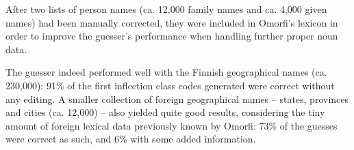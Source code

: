 \documentclass{llncs}
\begin{document}
%
% 

After two lists of person names (ca. 12,000 family names and ca. 4,000 given names) 
had been manually corrected, they were included in Omorfi's lexicon in order to improve the guesser's performance
when handling further proper noun data. 


The guesser indeed performed well with the Finnish geographical
names (ca. 230,000): 91\% of the first inflection class codes generated were
correct without any editing. A smaller collection of foreign
geographical names -- states, provinces and cities (ca. 12,000) --
also yielded quite good results, considering the tiny amount of
foreign lexical data previously known by Omorfi: 73\% of the guesses
were correct as such, and 6\% with some added information.
\end{document}
